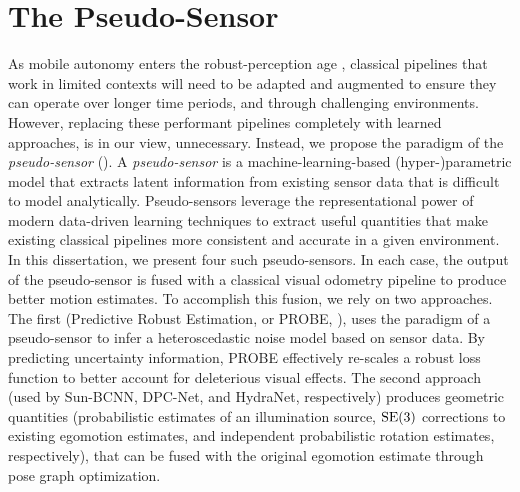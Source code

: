 \section{The Pseudo-Sensor}

As mobile autonomy enters the robust-perception age \citep{Cadena2016-ds}, classical pipelines that work in limited contexts will need to be adapted and augmented to ensure they can operate over longer time periods, and through challenging environments. However, replacing these performant pipelines completely with learned approaches, is in our view, unnecessary. Instead, we propose the paradigm of the  \textit{pseudo-sensor} (). A \textit{pseudo-sensor} is a machine-learning-based (hyper-)parametric model that extracts latent information from existing sensor data that is difficult to model analytically. Pseudo-sensors leverage the representational power of modern data-driven learning techniques to extract useful quantities that make existing classical pipelines more consistent and accurate in a given environment. In this dissertation, we present four such pseudo-sensors. In each case, the output of the pseudo-sensor is fused with a classical visual odometry pipeline to produce better motion estimates. To accomplish this fusion, we rely on two approaches. The first (Predictive Robust Estimation, or PROBE, ), uses the paradigm of a pseudo-sensor to infer a heteroscedastic noise model based on sensor data. By predicting uncertainty information, PROBE effectively re-scales a robust loss function to better account for deleterious visual effects. The second approach (used by Sun-BCNN, DPC-Net, and HydraNet,   respectively) produces geometric quantities (probabilistic estimates of an illumination source, $\mathrm{SE}(3)$ corrections to existing egomotion estimates, and independent probabilistic rotation estimates, respectively), that can be fused with the original egomotion estimate through pose graph optimization.


